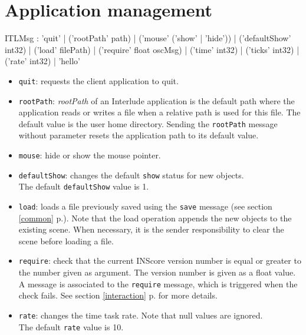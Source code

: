 \documentclass[a4paper,twoside]{report}
\newcommand{\sublevel}[1]	{\section{#1}}
\newcommand{\fullref}[1]	{\ref{#1} p.\pageref{#1}}
\newcommand{\OSC}[1]		{\texttt{#1}}
\begin{document}
\sublevel{Application management}
\label{applmgmt}

\begin{rail}
ITLMsg : 'quit' 
		| ('rootPath' path) 
		| ('mouse' ('show' | 'hide'))
		| ('defaultShow' int32)
		| ('load' filePath)
		| ('require' float oscMsg)
		| ('time' int32)
		| ('ticks' int32)
		| ('rate' int32)
		| 'hello'
\end{rail}

\begin{itemize}
\item \OSC{quit}: requests the client application to quit.

\item \OSC{rootPath}: \emph{rootPath} of an Interlude application is the default path where the application reads or writes a file when a relative path is used for this file. The default value is the user home directory. Sending the \OSC{rootPath} message without parameter resets the application path to its default value.

\item \OSC{mouse}: hide or show the mouse pointer.

\item \OSC{defaultShow}: changes the default \OSC{show} status for new objects. \\
The default \OSC{defaultShow} value is 1.

\item \OSC{load}: loads a file previously saved using the \OSC{save} message (see section \fullref{common}). Note that the load operation appends the new objects to the existing scene. When necessary, it is the sender responsibility to clear the scene before loading a file.

\item \OSC{require}: check that the current INScore version number is equal or greater to the number given as argument. The version number is given as a float value. A message is associated to the \OSC{require} message, which is triggered when the check fails. See section \fullref{interaction} for more details.

\item \OSC{rate}: changes the time task rate. Note that null values are ignored.\\
The default \OSC{rate} value is 10.


\end{itemize}
\end{document}
